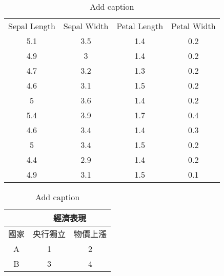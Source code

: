 \documentclass[12pt, a4paper]{article}
\begin{document}
\begin{table}[htbp]
  \centering
  \caption{Add caption}
    \begin{tabular}{cccc}
    Sepal Length & Sepal Width & Petal Length & Petal Width \\
    5.1   & 3.5   & 1.4   & 0.2 \\
    4.9   & 3     & 1.4   & 0.2 \\
    4.7   & 3.2   & 1.3   & 0.2 \\
    4.6   & 3.1   & 1.5   & 0.2 \\
    5     & 3.6   & 1.4   & 0.2 \\
    5.4   & 3.9   & 1.7   & 0.4 \\
    4.6   & 3.4   & 1.4   & 0.3 \\
    5     & 3.4   & 1.5   & 0.2 \\
    4.4   & 2.9   & 1.4   & 0.2 \\
    4.9   & 3.1   & 1.5   & 0.1 \\
    \end{tabular}%
  \label{tab:addlabel}%
\end{table}%

\begin{table}[htbp]
  \centering
  \caption{Add caption}
    \begin{tabular}{ccc}
\cmidrule{2-3}    \multicolumn{1}{r}{} & \multicolumn{2}{c}{\cellcolor[rgb]{ 1,  1,  0}經濟表現} \\
    \midrule
    國家    & 央行獨立  & 物價上漲 \\
    \midrule
    A     & 1     & 2 \\
    \midrule
    B     & 3     & 4 \\
    \bottomrule
    \end{tabular}%
  \label{tab:addlabel}%
\end{table}%
\end{document}
